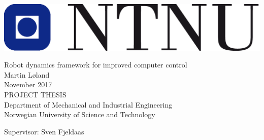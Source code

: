 
\thispagestyle{empty}
\includegraphics[scale=0.6]{img/ntnu}
\mbox{}\\[6pc]
\begin{center}
\Huge{Robot dynamics framework for improved computer control}\\[2pc]

\Large{Martin Løland}\\[1pc]
\large{November 2017}\\[2pc]

PROJECT THESIS\\
Department of Mechanical and Industrial Engineering\\
Norwegian University of Science and Technology
\end{center}
\vfill

\noindent Supervisor: Sven Fjeldaas
